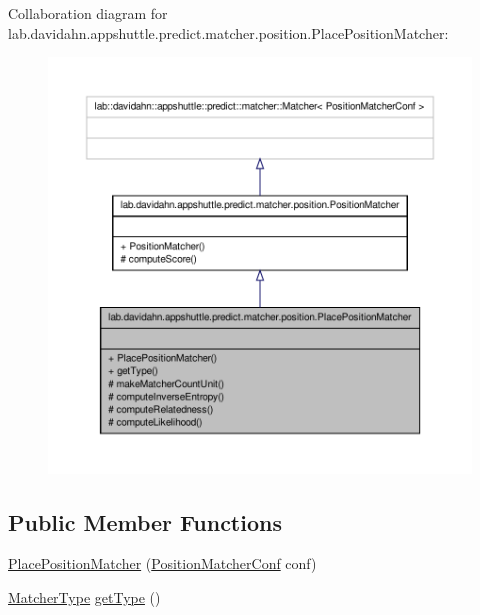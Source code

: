 \-Collaboration diagram for lab.\-davidahn.\-appshuttle.\-predict.\-matcher.\-position.\-Place\-Position\-Matcher\-:
\nopagebreak
\begin{figure}[H]
\begin{center}
\leavevmode
\includegraphics[width=350pt]{classlab_1_1davidahn_1_1appshuttle_1_1predict_1_1matcher_1_1position_1_1_place_position_matcher__coll__graph}
\end{center}
\end{figure}
\subsection*{\-Public \-Member \-Functions}
\begin{DoxyCompactItemize}
\item 
\hyperlink{classlab_1_1davidahn_1_1appshuttle_1_1predict_1_1matcher_1_1position_1_1_place_position_matcher_a0d0ebb2f084de009124c08c0906a57fe}{\-Place\-Position\-Matcher} (\hyperlink{classlab_1_1davidahn_1_1appshuttle_1_1predict_1_1matcher_1_1position_1_1_position_matcher_conf}{\-Position\-Matcher\-Conf} conf)
\item 
\hyperlink{enumlab_1_1davidahn_1_1appshuttle_1_1predict_1_1matcher_1_1_matcher_type}{\-Matcher\-Type} \hyperlink{classlab_1_1davidahn_1_1appshuttle_1_1predict_1_1matcher_1_1position_1_1_place_position_matcher_a07e9bec28eb615933847659362a36267}{get\-Type} ()
\end{DoxyCompactItemize}
